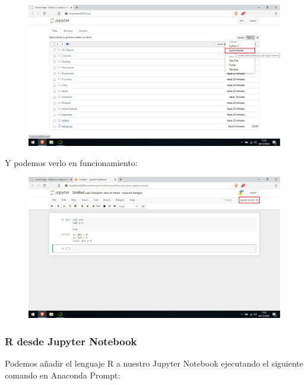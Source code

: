 \documentclass[a4paper,10pt]{article}
\begin{document}
\begin{figure}[H]
\begin{center}
\includegraphics[width=450pt]{./fotos/introduccion/22 - Scala desde notebook de anaconda (V).jpg}
\end{center}
\end{figure}

Y podemos verlo en funcionamiento:

\begin{figure}[H]
\begin{center}
\includegraphics[width=450pt]{./fotos/introduccion/23 - Scala en notebook funcionando (V).jpg}
\end{center}
\end{figure}

\subsubsection{R desde Jupyter Notebook}

Podemos añadir el lenguaje R a nuestro Jupyter Notebook ejecutando el siguiente comando en Anaconda Prompt:
\end{document}
